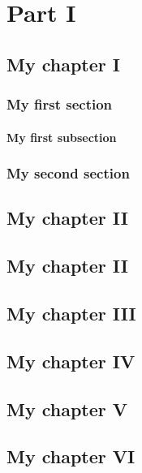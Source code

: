 \documentclass[open=any, titlepage=false, twocolumn, fontsize=10pt,]{scrbook}
\newcommand{\dochaptertoc}{%
    \vspace{-1.5\baselineskip} %
    \smash{\makebox[\linewidth]{\hrulefill}} %
    \vspace{-2.5\baselineskip} %
    \minitoc
    \vspace{-1.15\baselineskip} %
    \smash{\makebox[\linewidth]{\hrulefill}} %
    \vspace{-0.5\baselineskip} %
  }
\newcommand{\setchaptertoc}{%
    \setchapterpreamble{%
      \dochaptertoc%
    }
  }
\begin{document}
\setcounter{tocdepth}{-1} %
\setcounter{secnumdepth}{4}           %
\setcounter{parttocdepth}{0} 
\doparttoc
\setcounter{minitocdepth}{2} 
\dominitoc
\tableofcontents

\setcounter{page}{3000}  
\setcounter{chapter}{100}
\setcounter{part}{5080}

\setchaptertoc 

\renewcommand*\partname{Oddíl}

\part{Part I}
\parttoc
    \chapter{My chapter I}
        \section{My first section}  
          \blindtext
            \subsection{My first subsection}
                \blindtext  
        \section{My second section}
            \blindtext 
    \chapter{My chapter II}
    \chapter{My chapter II}
    \chapter{My chapter III}
    \chapter{My chapter IV}
    \chapter{My chapter V}
    \chapter{My chapter VI}
\end{document}
